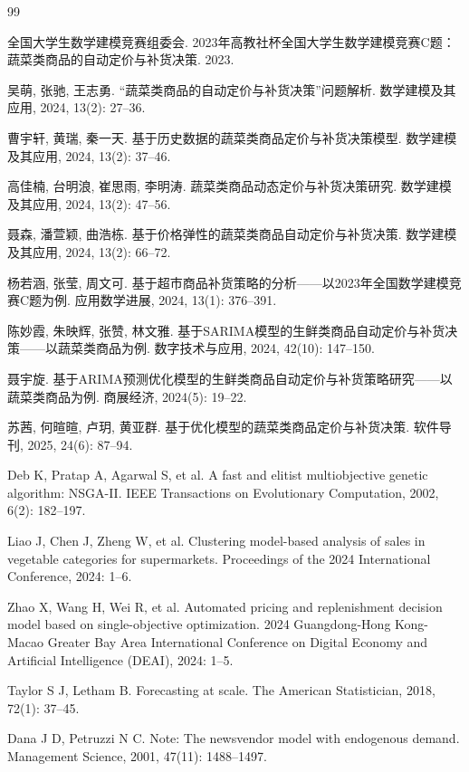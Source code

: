 
\begin{thebibliography}{99}

   全国大学生数学建模竞赛组委会. 2023年高教社杯全国大学生数学建模竞赛C题：蔬菜类商品的自动定价与补货决策. 2023.

   吴萌, 张驰, 王志勇. ``蔬菜类商品的自动定价与补货决策''问题解析. 数学建模及其应用, 2024, 13(2): 27--36.

   曹宇轩, 黄瑞, 秦一天. 基于历史数据的蔬菜类商品定价与补货决策模型. 数学建模及其应用, 2024, 13(2): 37--46.

   高佳楠, 台明浪, 崔思雨, 李明涛. 蔬菜类商品动态定价与补货决策研究. 数学建模及其应用, 2024, 13(2): 47--56.

   聂森, 潘萱颖, 曲浩栋. 基于价格弹性的蔬菜类商品自动定价与补货决策. 数学建模及其应用, 2024, 13(2): 66--72.

   杨若涵, 张莹, 周文可. 基于超市商品补货策略的分析——以2023年全国数学建模竞赛C题为例. 应用数学进展, 2024, 13(1): 376--391.

   陈妙霞, 朱映辉, 张赞, 林文雅. 基于SARIMA模型的生鲜类商品自动定价与补货决策——以蔬菜类商品为例. 数字技术与应用, 2024, 42(10): 147--150.

   聂宇旋. 基于ARIMA预测优化模型的生鲜类商品自动定价与补货策略研究——以蔬菜类商品为例. 商展经济, 2024(5): 19--22.

   苏茜, 何暄暄, 卢玥, 黄亚群. 基于优化模型的蔬菜类商品定价与补货决策. 软件导刊, 2025, 24(6): 87--94.

   Deb K, Pratap A, Agarwal S, et al. A fast and elitist multiobjective genetic algorithm: NSGA-II. IEEE Transactions on Evolutionary Computation, 2002, 6(2): 182--197.

   Liao J, Chen J, Zheng W, et al. Clustering model-based analysis of sales in vegetable categories for supermarkets. Proceedings of the 2024 International Conference, 2024: 1--6.

   Zhao X, Wang H, Wei R, et al. Automated pricing and replenishment decision model based on single-objective optimization. 2024 Guangdong-Hong Kong-Macao Greater Bay Area International Conference on Digital Economy and Artificial Intelligence (DEAI), 2024: 1--5.

   Taylor S J, Letham B. Forecasting at scale. The American Statistician, 2018, 72(1): 37--45.

   Dana J D, Petruzzi N C. Note: The newsvendor model with endogenous demand. Management Science, 2001, 47(11): 1488--1497.


\end{thebibliography}

